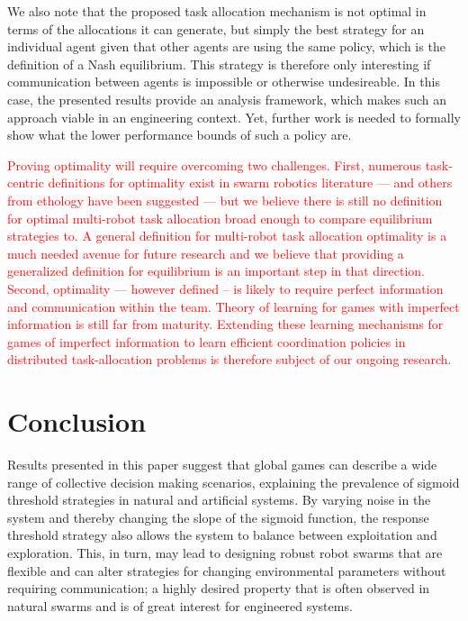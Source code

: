 \documentclass[smallextended]{svjour3}       %
\newcommand{\edit}[1]{\textcolor{red}{#1}}
\begin{document}
We also note that the proposed task allocation mechanism is not optimal in terms of the allocations it can generate, but simply the best strategy for an individual agent given that other agents are using the same policy, which is the definition of a Nash equilibrium. This strategy is therefore only interesting if communication between agents is impossible or otherwise undesireable. In this case, the presented results provide an analysis framework, which makes such an approach viable in an engineering context. Yet, further work is needed to formally show what the lower performance bounds of such a policy are. 

\edit{Proving optimality will require overcoming two challenges. First, numerous task-centric definitions for optimality exist in swarm robotics literature \citep{Gerkey2003} --- and others from ethology have been suggested \citep{Bonabeau2000} --- but we believe there is still no definition for optimal multi-robot task allocation broad enough to compare equilibrium strategies to. A general definition for multi-robot task allocation optimality is a much needed avenue for future research and we believe that providing a generalized definition for equilibrium is an important step in that direction. Second, optimality --- however defined -- is likely to require perfect information and communication within the team. Theory of learning for games with imperfect information is still far from maturity. Extending these learning mechanisms for games of imperfect information to learn efficient coordination policies in distributed task-allocation problems is therefore subject of our ongoing research. }


\section{Conclusion}
Results presented in this paper suggest that global games can describe a wide range of collective decision making scenarios, explaining the prevalence of sigmoid threshold strategies in natural and artificial systems. By varying noise in the system and thereby changing the slope of the sigmoid function, the response threshold strategy also allows the system to balance between exploitation and exploration. This, in turn, may lead to designing robust robot swarms that are flexible and can alter strategies for changing environmental parameters without requiring communication; a highly desired property that is often observed in natural swarms and is of great interest for engineered systems.
\end{document}
